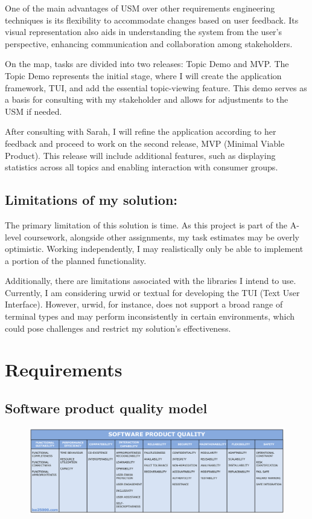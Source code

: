 \documentclass[10pt , a4paper]{report}
\begin{document}
One of the main advantages of USM over other requirements engineering techniques is its flexibility to accommodate changes based on user feedback. Its visual representation also aids in understanding the system from the user’s perspective, enhancing communication and collaboration among stakeholders.

On the map, tasks are divided into two releases: Topic Demo and MVP. The Topic Demo represents the initial stage, where I will create the application framework, TUI, and add the essential topic-viewing feature. This demo serves as a basis for consulting with my stakeholder and allows for adjustments to the USM if needed.

After consulting with Sarah, I will refine the application according to her feedback and proceed to work on the second release, MVP (Minimal Viable Product). This release will include additional features, such as displaying statistics across all topics and enabling interaction with consumer groups.

\section{Limitations of my solution:}

The primary limitation of this solution is time. As this project is part of the A-level coursework, alongside other assignments, my task estimates may be overly optimistic. Working independently, I may realistically only be able to implement a portion of the planned functionality.

Additionally, there are limitations associated with the libraries I intend to use. Currently, I am considering urwid or textual for developing the TUI (Text User Interface). However, urwid, for instance, does not support a broad range of terminal types and may perform inconsistently in certain environments, which could pose challenges and restrict my solution’s effectiveness.

\chapter{Requirements}

\section{Software product quality model}

\begin{figure}[htbp]
    \centering
    \includegraphics[width=1\linewidth]{imgs/ISO25010.png}
    \label{fig:quality_model}
\end{figure}
\end{document}
